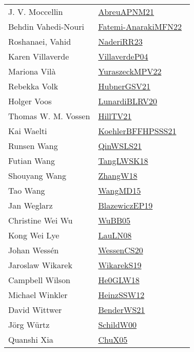 {\begin{longtable}{p{4cm}p{20cm}}
J. V. Moccellin & \href{}{AbreuAPNM21}~\cite{AbreuAPNM21}\\
Behdin Vahedi-Nouri & \href{}{Fatemi-AnarakiMFN22}~\cite{Fatemi-AnarakiMFN22}\\
Roshanaei, Vahid & \href{articles/NaderiRR23.pdf}{NaderiRR23}~\cite{NaderiRR23}\\
Karen Villaverde & \href{}{VillaverdeP04}~\cite{VillaverdeP04}\\
Mariona Vil{\`a} & \href{articles/YuraszeckMPV22.pdf}{YuraszeckMPV22}~\cite{YuraszeckMPV22}\\
Rebekka Volk & \href{articles/HubnerGSV21.pdf}{HubnerGSV21}~\cite{HubnerGSV21}\\
Holger Voos & \href{articles/LunardiBLRV20.pdf}{LunardiBLRV20}~\cite{LunardiBLRV20}\\
Thomas W. M. Vossen & \href{papers/HillTV21.pdf}{HillTV21}~\cite{HillTV21}\\
Kai Waelti & \href{articles/KoehlerBFFHPSSS21.pdf}{KoehlerBFFHPSSS21}~\cite{KoehlerBFFHPSSS21}\\
Runsen Wang & \href{articles/QinWSLS21.pdf}{QinWSLS21}~\cite{QinWSLS21}\\
Futian Wang & \href{}{TangLWSK18}~\cite{TangLWSK18}\\
Shouyang Wang & \href{articles/ZhangW18.pdf}{ZhangW18}~\cite{ZhangW18}\\
Tao Wang & \href{articles/WangMD15.pdf}{WangMD15}~\cite{WangMD15}\\
Jan Weglarz & \href{}{BlazewiczEP19}~\cite{BlazewiczEP19}\\
Christine Wei Wu & \href{papers/WuBB05.pdf}{WuBB05}~\cite{WuBB05}\\
Kong Wei Lye & \href{papers/LauLN08.pdf}{LauLN08}~\cite{LauLN08}\\
Johan Wess{\'{e}}n & \href{papers/WessenCS20.pdf}{WessenCS20}~\cite{WessenCS20}\\
Jaroslaw Wikarek & \href{articles/WikarekS19.pdf}{WikarekS19}~\cite{WikarekS19}\\
Campbell Wilson & \href{papers/He0GLW18.pdf}{He0GLW18}~\cite{He0GLW18}\\
Michael Winkler & \href{articles/HeinzSSW12.pdf}{HeinzSSW12}~\cite{HeinzSSW12}\\
David Wittwer & \href{papers/BenderWS21.pdf}{BenderWS21}~\cite{BenderWS21}\\
J{\"{o}}rg W{\"{u}}rtz & \href{articles/SchildW00.pdf}{SchildW00}~\cite{SchildW00}\\
Quanshi Xia & \href{papers/ChuX05.pdf}{ChuX05}~\cite{ChuX05}\\

\end{longtable}}
